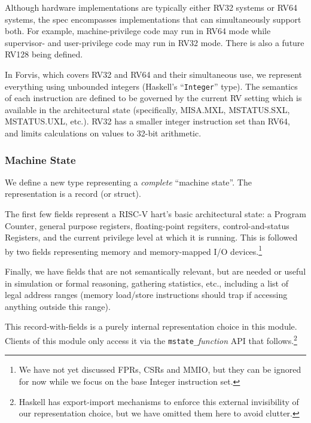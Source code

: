 \documentclass[11pt]{article}
\begin{document}
Although hardware implementations are typically either RV32 systems or
RV64 systems, the spec encompasses implementations that can
simultaneously support both.  For example, machine-privilege code may
run in RV64 mode while supervisor- and user-privilege code may run in
RV32 mode.  There is also a future RV128 being defined.

In Forvis, which covers RV32 and RV64 and their simultaneous use, we
represent everything using unbounded integers (Haskell's
``\verb|Integer|'' type).  The semantics of each instruction are
defined to be governed by the current RV setting which is available in
the architectural state (specifically, MISA.MXL, MSTATUS.SXL,
MSTATUS.UXL, etc.).  RV32 has a smaller integer instruction set than
RV64, and limits calculations on values to 32-bit arithmetic.


\subsubsection{Machine State}

We define a new type representing a \emph{complete} ``machine state''.
The representation is a record (or struct).



The first few fields represent a RISC-V hart's basic architectural
state: a Program Counter, general purpose registers, floating-point
regsiters, control-and-status Registers, and the current privilege
level at which it is running. This is followed by two fields
representing memory and memory-mapped I/O devices.\footnote{We have
not yet discussed FPRs, CSRs and MMIO, but they can be ignored for now
while we focus on the base Integer instruction set.}

Finally, we have fields that are not semantically relevant, but are
needed or useful in simulation or formal reasoning, gathering
statistics, etc., including a list of legal address ranges (memory
load/store instructions should trap if accessing anything outside this
range).

This record-with-fields is a purely internal representation choice in
this module.  Clients of this module only access it via the
\verb|mstate_|{\it{}function} API that follows.\footnote{Haskell has
export-import mechanisms to enforce this external invisibility of our
representation choice, but we have omitted them here to avoid
clutter.}
\end{document}
